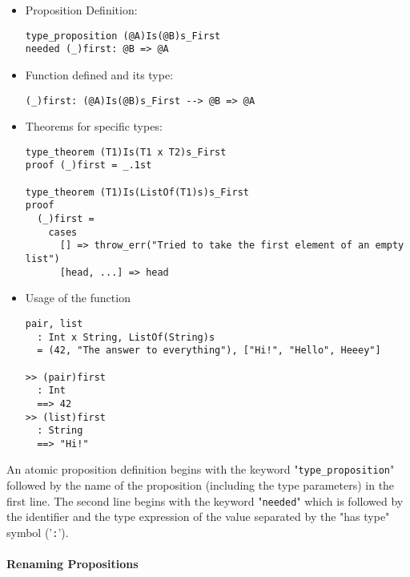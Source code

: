 \documentclass[diploma]{softlab-thesis}
\begin{document}
\begin{itemize}
\begin{itemize}
\item Proposition Definition:

\begin{verbatim}
type_proposition (@A)Is(@B)s_First
needed (_)first: @B => @A
\end{verbatim}

\item Function defined and its type:

\begin{verbatim}
(_)first: (@A)Is(@B)s_First --> @B => @A
\end{verbatim}

\item Theorems for specific types:

\begin{verbatim}
type_theorem (T1)Is(T1 x T2)s_First
proof (_)first = _.1st

type_theorem (T1)Is(ListOf(T1)s)s_First
proof
  (_)first =
    cases
      [] => throw_err("Tried to take the first element of an empty list")
      [head, ...] => head
\end{verbatim}

\item Usage of the function
\begin{verbatim}
pair, list
  : Int x String, ListOf(String)s
  = (42, "The answer to everything"), ["Hi!", "Hello", Heeey"]

>> (pair)first
  : Int
  ==> 42
>> (list)first
  : String
  ==> "Hi!"
\end{verbatim}
\end{itemize}

An atomic proposition definition begins with the keyword
"\verb|type_proposition|" followed by the name of the proposition (including
the type parameters) in the first line. The second line begins with the keyword
"\verb|needed|" which is followed by the identifier and the
type expression of the value separated by the "has type" symbol ('\verb|:|').

\end{itemize}

\newpage

\paragraph{Renaming Propositions}
\end{document}
